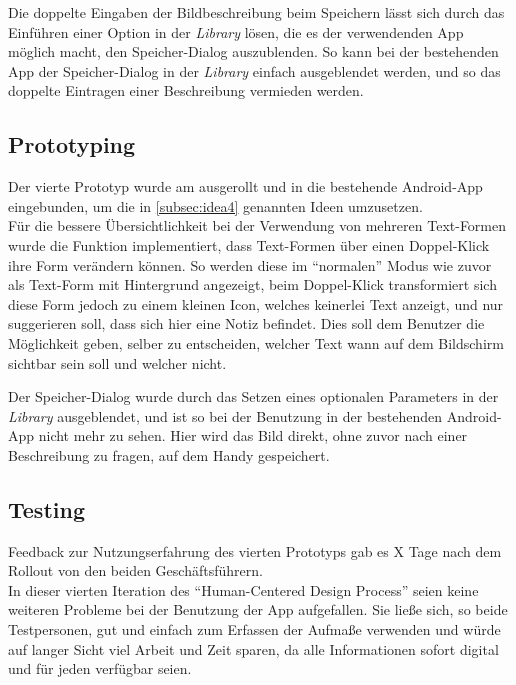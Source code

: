 Die doppelte Eingaben der Bildbeschreibung beim Speichern lässt sich durch das Einführen einer Option in der \emph{Library} lösen, die es der verwendenden App möglich macht, den Speicher-Dialog auszublenden.
So kann bei der bestehenden App der Speicher-Dialog in der \emph{Library} einfach ausgeblendet werden, und so das doppelte Eintragen einer Beschreibung vermieden werden. \\

\subsection{Prototyping}
Der vierte Prototyp wurde am  ausgerollt und in die bestehende Android-App eingebunden, um die in \autoref{subsec:idea4} genannten Ideen umzusetzen. \\

Für die bessere Übersichtlichkeit bei der Verwendung von mehreren Text-Formen wurde die Funktion implementiert, dass Text-Formen über einen Doppel-Klick ihre Form verändern können.
So werden diese im ``normalen'' Modus wie zuvor als Text-Form mit Hintergrund angezeigt, beim Doppel-Klick transformiert sich diese Form jedoch zu einem kleinen Icon, welches keinerlei Text anzeigt, und nur suggerieren soll, dass sich hier eine Notiz befindet. 
Dies soll dem Benutzer die Möglichkeit geben, selber zu entscheiden, welcher Text wann auf dem Bildschirm sichtbar sein soll und welcher nicht. \\

Der Speicher-Dialog wurde durch das Setzen eines optionalen Parameters in der \emph{Library} ausgeblendet, und ist so bei der Benutzung in der bestehenden Android-App nicht mehr zu sehen.
Hier wird das Bild direkt, ohne zuvor nach einer Beschreibung zu fragen, auf dem Handy gespeichert. \\

\subsection{Testing}
Feedback zur Nutzungserfahrung des vierten Prototyps gab es X Tage nach dem Rollout von den beiden Geschäftsführern. \\

In dieser vierten Iteration des ``Human-Centered Design Process'' seien keine weiteren Probleme bei der Benutzung der App aufgefallen.
Sie ließe sich, so beide Testpersonen, gut und einfach zum Erfassen der Aufmaße verwenden und würde auf langer Sicht viel Arbeit und Zeit sparen, da alle Informationen sofort digital und für jeden verfügbar seien.

